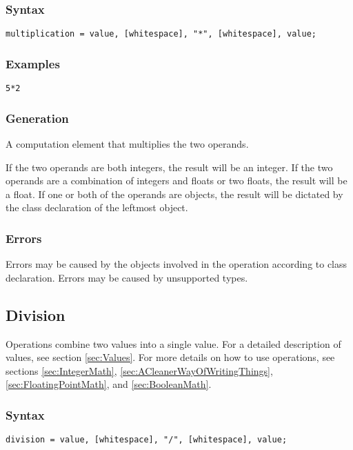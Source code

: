 \documentclass[10pt,a4paper]{article}
\begin{document}
\subsubsection{Syntax}
\begin{verbatim}
multiplication = value, [whitespace], "*", [whitespace], value;
\end{verbatim}

\subsubsection{Examples}
\begin{verbatim}
5*2
\end{verbatim}

\subsubsection{Generation}
A computation element that multiplies the two operands.

If the two operands are both integers, the result will be an integer. If the two operands are a combination of integers and floats or two floats, the result will be a float. If one or both of the operands are objects, the result will be dictated by the class declaration of the leftmost object.

\subsubsection{Errors}
Errors may be caused by the objects involved in the operation according to class declaration. Errors may be caused by unsupported types.

\newpage




\subsection{Division}
Operations combine two values into a single value. For a detailed description of values, see section \ref{sec:Values}. For more details on how to use operations, see sections \ref{sec:IntegerMath}, \ref{sec:ACleanerWayOfWritingThings}, \ref{sec:FloatingPointMath}, and \ref{sec:BooleanMath}.

\subsubsection{Syntax}
\begin{verbatim}
division = value, [whitespace], "/", [whitespace], value;
\end{verbatim}
\end{document}

